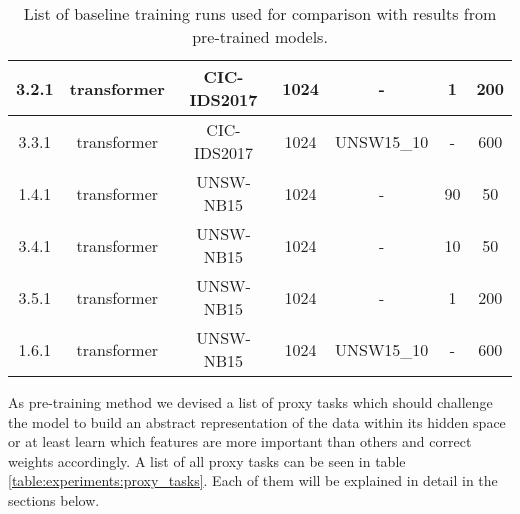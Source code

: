 \begin{table}[]
{\begin{tabular}{c c c c c c c}
			3.2.1 \label{ex_1_2_3}           & transformer    & CIC-IDS2017     & 1024                                     & -			& 1                    & 200                                           \\ \midrule
			3.3.1 \label{ex_1_2_4}           & transformer    & CIC-IDS2017     & 1024                                     & UNSW15\_10	& -                    & 600                                           \\ \midrule
			1.4.1 \label{ex_1_2_5}           & transformer    & UNSW-NB15        & 1024                                     & -			& 90                   & 50                                            \\ \midrule
			3.4.1 \label{ex_1_2_6}           & transformer    & UNSW-NB15        & 1024                                     & -			& 10                   & 50                                            \\ \midrule
			3.5.1 \label{ex_1_2_7}           & transformer    & UNSW-NB15        & 1024                                     & -			& 1                    & 200                                           \\ \midrule
			1.6.1 \label{ex_1_2_8}           & transformer    & UNSW-NB15        & 1024                                     & UNSW15\_10	& -                    & 600                                           \\
	\end{tabular}}
	\caption{List of baseline training runs used for comparison with results from pre-trained models.}
	\label{table:experiments:baseline}
\end{table}

As pre-training method we devised a list of proxy tasks which should challenge the model to build an abstract representation of the data within its hidden space or at least learn which features are more important than others and correct weights accordingly. A list of all proxy tasks can be seen in table \ref{table:experiments:proxy_tasks}. Each of them will be explained in detail in the sections below.

